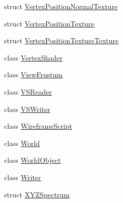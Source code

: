 \begin{DoxyCompactItemize}
\item 
struct \hyperlink{structmage_1_1_vertex_position_normal_texture}{Vertex\+Position\+Normal\+Texture}
\item 
struct \hyperlink{structmage_1_1_vertex_position_texture}{Vertex\+Position\+Texture}
\item 
struct \hyperlink{structmage_1_1_vertex_position_texture_texture}{Vertex\+Position\+Texture\+Texture}
\item 
class \hyperlink{classmage_1_1_vertex_shader}{Vertex\+Shader}
\item 
class \hyperlink{classmage_1_1_view_frustum}{View\+Frustum}
\item 
class \hyperlink{classmage_1_1_v_s_reader}{V\+S\+Reader}
\item 
class \hyperlink{classmage_1_1_v_s_writer}{V\+S\+Writer}
\item 
class \hyperlink{classmage_1_1_wireframe_script}{Wireframe\+Script}
\item 
class \hyperlink{classmage_1_1_world}{World}
\item 
class \hyperlink{classmage_1_1_world_object}{World\+Object}
\item 
class \hyperlink{classmage_1_1_writer}{Writer}
\item 
struct \hyperlink{structmage_1_1_x_y_z_spectrum}{X\+Y\+Z\+Spectrum}
\end{DoxyCompactItemize}
